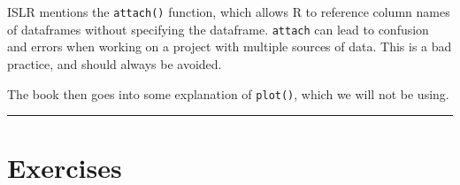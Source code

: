 \documentclass[]{book}
\begin{document}
ISLR mentions the \texttt{attach()} function, which allows R to reference column names of dataframes without specifying the dataframe. \texttt{attach} can lead to confusion and errors when working on a project with multiple sources of data. This is a bad practice, and should always be avoided.

The book then goes into some explanation of \texttt{plot()}, which we will not be using.

\begin{center}\rule{0.5\linewidth}{\linethickness}\end{center}

\hypertarget{exercises}{%
\section{Exercises}\label{exercises}}
\end{document}

